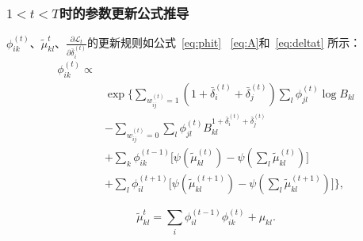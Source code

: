 \subsubsection{$1<t<T$时的参数更新公式推导}
$\phi_{ik}^{(t)}、\tilde{\mu}_{kl}^t、\frac{\partial \mathscr{L}_t}{\partial \bar{\delta}_i^{(t)}}$的更新规则如公式~\ref{eq:phit} ~\ref{eq:A}和~\ref{eq:deltat} 所示：
   \begin{equation}
   \begin{split}
   \phi_{ik}^{(t)} \propto \\
   &\exp\bigg\{ \sum_{w_{ij}^{(t)}=1} (1+\bar{\delta}_i^{(t)}+\bar{\delta}_j^{(t)}) \sum_l \phi_{jl}^{(t)} \log B_{kl} \\
   & -\sum_{w_{ij}^{(t)}=0} \sum_l \phi_{jl}^{(t)}  B_{kl}^{1+\bar{\delta}_i^{(t)}+\bar{\delta}_j^{(t)}}  \\
  & +\sum_k \phi_{ik}^{(t-1)} \Big[\psi(\tilde{\mu}_{kl}^{(t)}) - \psi(\sum_l \tilde{\mu}_{kl}^{(t)})\Big] \\
   &+ \sum_l \phi_{il}^{(t+1)} \Big[\psi(\tilde{\mu}_{kl}^{(t+1)}) - \psi(\sum_l \tilde{\mu}_{kl}^{(t+1)})\Big] \bigg\},
   \label{eq:phit}
   \end{split}
   \end{equation}

   \begin{equation}
   \tilde{\mu}_{kl}^t = \sum_i \phi_{il}^{(t-1)} \phi_{ik}^{(t)} + \mu_{kl}.
   \label{eq:A}
   \end{equation}

 


